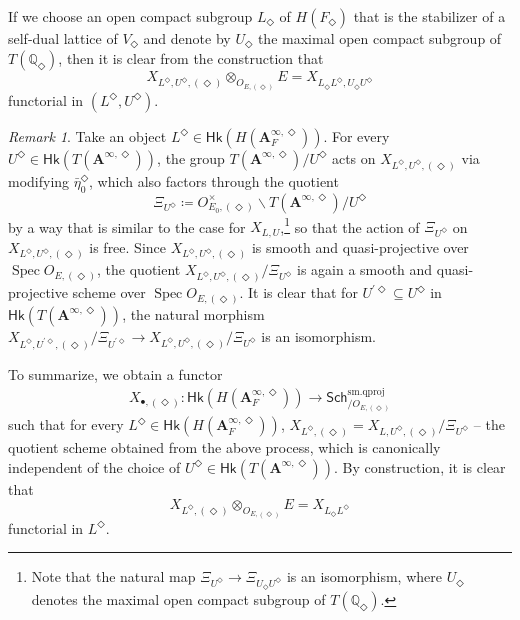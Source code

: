 \documentclass[12pt]{amsart}
\numberwithin{equation}{section}
\theoremstyle{plain}
\theoremstyle{definition}
\theoremstyle{remark}
\newtheorem{remark}[proposition]{Remark}
\renewcommand{\b}[1]{\mathbf{#1}}
\renewcommand{\d}[1]{\mathbb{#1}}
\renewcommand{\r}[1]{\mathrm{#1}}
\renewcommand{\sf}[1]{\mathsf{#1}}
\renewcommand{\(}{\left(}
\renewcommand{\)}{\right)}
\newcommand{\bA}{\b A}
\newcommand{\dQ}{\d Q}
\newcommand{\smq}{\r{sm.qproj}}
\newcommand{\Sch}{\sf{Sch}}
\newcommand{\Hk}{\sf{Hk}}
\DeclareMathOperator{\Spec}{Spec}
\begin{document}
If we choose an open compact subgroup $L_\Diamond$ of $H(F_\Diamond)$ that is the stabilizer of a self-dual lattice of $V_\Diamond$ and denote by $U_\Diamond$ the maximal open compact subgroup of $T(\dQ_\Diamond)$, then it is clear from the construction that
\[
X_{L^\Diamond,U^\Diamond,(\Diamond)}\otimes_{O_{E,(\Diamond)}}E=X_{L_\Diamond L^\Diamond,U_\Diamond U^\Diamond}
\]
functorial in $(L^\Diamond,U^\Diamond)$.




\begin{remark}
Take an object $L^\Diamond\in\Hk(H(\bA_F^{\infty,\Diamond}))$. For every $U^\Diamond\in\Hk(T(\bA^{\infty,\Diamond}))$, the group $T(\bA^{\infty,\Diamond})/U^\Diamond$ acts on $X_{L^\Diamond,U^\Diamond,(\Diamond)}$ via modifying $\bar\eta_0^\Diamond$, which also factors through the quotient
\[
\Xi_{U^\Diamond}\coloneqq O_{E_0,(\Diamond)}^\times\backslash T(\bA^{\infty,\Diamond})/U^\Diamond
\]
by a way that is similar to the case for $X_{L,U}$,\footnote{Note that the natural map $\Xi_{U^\Diamond}\to\Xi_{U_\Diamond U^\Diamond}$ is an isomorphism, where $U_\Diamond$ denotes the maximal open compact subgroup of $T(\dQ_\Diamond)$.} so that the action of $\Xi_{U^\Diamond}$ on $X_{L^\Diamond,U^\Diamond,(\Diamond)}$ is free. Since $X_{L^\Diamond,U^\Diamond,(\Diamond)}$ is smooth and quasi-projective over $\Spec O_{E,(\Diamond)}$, the quotient $X_{L^\Diamond,U^\Diamond,(\Diamond)}/\Xi_{U^\Diamond}$ is again a smooth and quasi-projective scheme over $\Spec O_{E,(\Diamond)}$. It is clear that for $U^{\prime\Diamond}\subseteq U^\Diamond$ in $\Hk(T(\bA^{\infty,\Diamond}))$, the natural morphism $X_{L^\Diamond,U^{\prime\Diamond},(\Diamond)}/\Xi_{U^{\prime\Diamond}}\to X_{L^\Diamond,U^\Diamond,(\Diamond)}/\Xi_{U^\Diamond}$ is an isomorphism.

To summarize, we obtain a functor
\begin{align*}
X_{\bullet,(\Diamond)}\colon\Hk(H(\bA_F^{\infty,\Diamond}))\to\Sch^\smq_{/O_{E,(\Diamond)}}
\end{align*}
such that for every $L^\Diamond\in\Hk(H(\bA_F^{\infty,\Diamond}))$, $X_{L^\Diamond,(\Diamond)}=X_{L,U^\Diamond,(\Diamond)}/\Xi_{U^\Diamond}$ -- the quotient scheme obtained from the above process, which is canonically independent of the choice of $U^\Diamond\in\Hk(T(\bA^{\infty,\Diamond}))$. By construction, it is clear that
\[
X_{L^\Diamond,(\Diamond)}\otimes_{O_{E,(\Diamond)}}E=X_{L_\Diamond L^\Diamond}
\]
functorial in $L^\Diamond$.
\end{remark}
\end{document}
